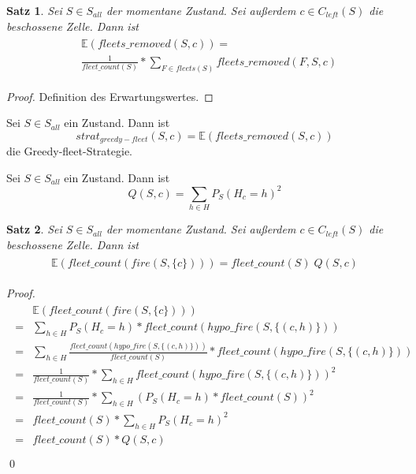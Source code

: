 \documentclass[a4paper,12pt]{llncs}
\numberwithin{equation}{section}
\newtheorem{satz}{Satz}
\begin{document}
\begin{satz}
Sei $S\in S_{all}$ der momentane Zustand.
Sei außerdem $c \in C_{left}(S)$ die beschossene Zelle.
Dann ist
\begin{align}
\begin{split}
&\mathds{E}(fleets\_removed(S,c))=\\
&\frac{1}{fleet\_count(S)} * \sum_{F \in fleets(S)} fleets\_removed(F, S, c) \nonumber
\end{split}
\end{align}
\end{satz}

\begin{proof}
Definition des Erwartungswertes.
\end{proof}

\begin{definition}
Sei $S\in S_{all}$ ein Zustand.
Dann ist
\[
strat_{greedy-fleet}(S,c)=\mathds{E}(fleets\_removed(S,c))
\]
die Greedy-fleet-Strategie.
\end{definition}


\begin{definition}
Sei $S\in S_{all}$ ein Zustand.
Dann ist
\[
Q(S,c)=\sum_{h \in H} P_S(H_{c}=h)^2
\]
\end{definition}

\begin{satz}
Sei $S\in S_{all}$ der momentane Zustand.
Sei außerdem $c \in C_{left}(S)$ die beschossene Zelle.
Dann ist
\begin{align}
\begin{split}
\mathds{E}(fleet\_count(fire(S,\{c\})))=fleet\_count(S)\; Q(S,c)
\end{split}
\end{align}
\end{satz}

\begin{proof}
\begin{align}
\begin{split}
&\mathds{E}(fleet\_count(fire(S,\{c\})))\\
=&\sum_{h \in H} P_S(H_{c} = h) * fleet\_count(hypo\_fire(S,\{(c,h)\}))\\
=&\sum_{h \in H} \frac{fleet\_count(hypo\_fire(S,\{(c,h)\}))}{fleet\_count(S)}* fleet\_count(hypo\_fire(S,\{(c,h)\}))\\
=&\frac{1}{fleet\_count(S)} * \sum_{h \in H} fleet\_count(hypo\_fire(S,\{(c,h)\}))^2\\
=&\frac{1}{fleet\_count(S)} * \sum_{h \in H} (P_S(H_{c} = h) * fleet\_count(S))^2\\
=&fleet\_count(S) * \sum_{h \in H} P_S(H_{c} = h)^2\\
=&fleet\_count(S) * Q(S,c)\\
\end{split}
\end{align}
\qed
\end{proof}
\end{document}
